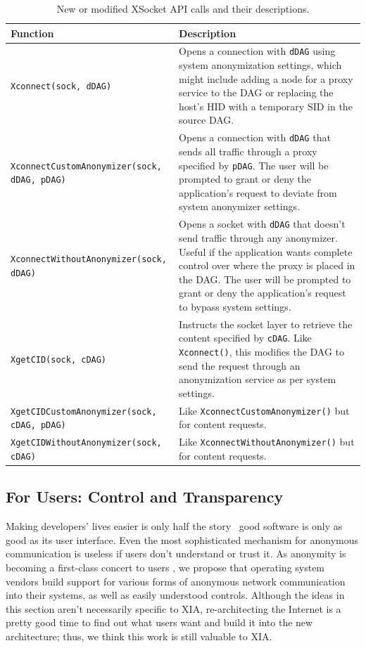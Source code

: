 \documentclass{article}
\begin{document}
\begin{table}
\centering
	\begin{tabular}{l p{7.5cm}}
	\textbf{Function} 	&	\textbf{Description}\\
	\hline
	\texttt{Xconnect(sock, dDAG)} & Opens a connection with \texttt{dDAG} using system anonymization settings, which might include adding a node for a proxy service to the DAG or replacing the host's HID with a temporary SID in the source DAG.\\
	\texttt{XconnectCustomAnonymizer(sock, dDAG, pDAG)} & Opens a connection with \texttt{dDAG} that sends all traffic through a proxy specified by \texttt{pDAG}. The user will be prompted to grant or deny the application's request to deviate from system anonymizer settings.\\
	\texttt{XconnectWithoutAnonymizer(sock, dDAG)} & Opens a socket with \texttt{dDAG} that doesn't send traffic through any anonymizer. Useful if the application wants complete control over where the proxy is placed in the DAG. The user will be prompted to grant or deny the application's request to bypass system settings.\\
	\texttt{XgetCID(sock, cDAG)} & Instructs the socket layer to retrieve the content specified by \texttt{cDAG}. Like \texttt{Xconnect()}, this modifies the DAG to send the request through an anonymization service as per system settings.\\
	\texttt{XgetCIDCustomAnonymizer(sock, cDAG, pDAG)} & Like \texttt{XconnectCustomAnonymizer()} but for content requests.\\
	\texttt{XgetCIDWithoutAnonymizer(sock, cDAG)} & Like \texttt{XconnectWithoutAnonymizer()} but for content requests.\\
	\hline
	\end{tabular}
	\caption{New or modified XSocket API calls and their descriptions.}
	\label{table:api-extension}
\end{table}


\subsection{For Users: Control and Transparency}
\label{control}
Making developers' lives easier is only half the story \textemdash~good software is only as good as its user interface. Even the most sophisticated mechanism for anonymous communication is useless if users don't understand or trust it. As anonymity is becoming a first-class concert to users \cite{user-study}, we propose that operating system vendors build support for various forms of anonymous network communication into their systems, as well as easily understood controls. Although the ideas in this section aren't necessarily specific to XIA, re-architecting the Internet is a pretty good time to find out what users want and build it into the new architecture; thus, we think this work is still valuable to XIA.
\end{document}
